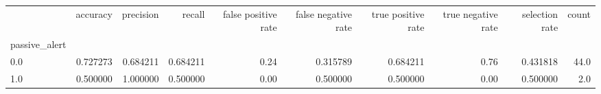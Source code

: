 \begin{tabular}{lrrrrrrrrr}
\toprule
{} &  accuracy &  precision &    recall &  false positive rate &  false negative rate &  true positive rate &  true negative rate &  selection rate &  count \\
passive\_alert &           &            &           &                      &                      &                     &                     &                 &        \\
\midrule
0.0           &  0.727273 &   0.684211 &  0.684211 &                 0.24 &             0.315789 &            0.684211 &                0.76 &        0.431818 &   44.0 \\
1.0           &  0.500000 &   1.000000 &  0.500000 &                 0.00 &             0.500000 &            0.500000 &                0.00 &        0.500000 &    2.0 \\
\bottomrule
\end{tabular}
